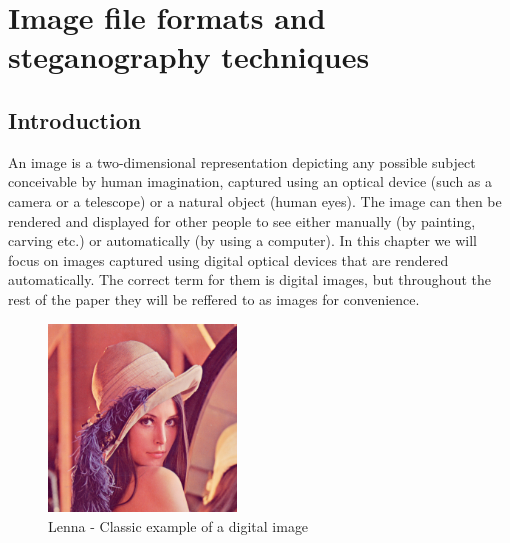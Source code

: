 
\chapter{Image file formats and steganography techniques}

\section{Introduction}

\setlength\columnsep{20pt}
\begin{multicols}{2}
An image is a two-dimensional representation depicting any possible subject conceivable by human imagination, captured using an optical device (such as a camera or a telescope) or a natural object (human eyes). The image can then be rendered and displayed for other people to see either manually (by painting, carving etc.) or automatically (by using a computer). In this chapter we will focus on images captured using digital optical devices that are rendered automatically. The correct term for them is digital images, but throughout the rest of the paper they will be reffered to as images for convenience.

\begin{figure}[H]
    \centering
    \includegraphics[width=5cm,height=5cm,keepaspectratio]{pics/lenna}
    \caption{Lenna - Classic example of a digital image}
    \label{Lenna}
\end{figure}


\end{multicols}
